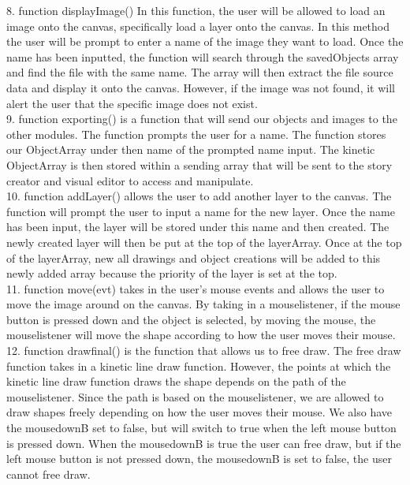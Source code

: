 \documentclass[a4paper, 11pt]{article} %
\begin{document}
8.	function displayImage() In this function, the user will be allowed to load an image onto the canvas, specifically load a layer onto the canvas. In this method the user will be prompt to enter a name of the image they want to load. Once the name has been inputted, the function will search through the savedObjects array and find the file with the same name. The array will then extract the file source data and display it onto the canvas. However, if the image was not found, it will alert the user that the specific image does not exist.\\

9.	function exporting() is a function that will send our objects and images to the other modules. The function prompts the user for a name. The function stores our ObjectArray under then name of the prompted name input. The kinetic ObjectArray is then stored within a sending array that will be sent to the story creator and visual editor to access and manipulate.\\

10.	function addLayer() allows the user to add another layer to the canvas. The function will prompt the user to input a name for the new layer. Once the name has been input, the layer will be stored under this name and then created. The newly created layer will then be put at the top of the layerArray. Once at the top of the layerArray, new all drawings and object creations will be added to this newly added array because the priority of the layer is set at the top.  \\

11.	function move(evt) takes in the user’s mouse events and allows the user to move the image around on the canvas. By taking in a mouselistener, if the mouse button is pressed down and the object is selected, by moving the mouse, the mouselistener will move the shape according to how the user moves their mouse. \\

12.	function drawfinal() is the function that allows us to free draw. The free draw function takes in a kinetic line draw function. However, the points at which the kinetic line draw function draws the shape depends on the path of the mouselistener. Since the path is based on the mouselistener, we are allowed to draw shapes freely depending on how the user moves their mouse. We also have the mousedownB set to false, but will switch to true when the left mouse button is pressed down. When the mousedownB is true the user can free draw, but if the left mouse button is not pressed down, the mousedownB is set to false, the user cannot free draw. \\
\end{document}
